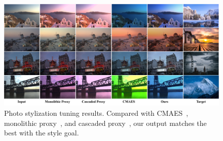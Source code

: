 \documentclass{article}
\newcommand{\TaskPST}{Photo stylization tuning\xspace}
\begin{document}
\begin{table}[t]
\caption{Experimental results demonstrating efficiency across varying input resolutions. Our method significantly outperforms other methods, achieving a speed enhancement of 260 times relative to the cascaded proxy method~\cite{tseng2022neural} at 720P resolution, and 117 times faster than the CMAES approach~\cite{hansen2006cma, mosleh2020hardware} at 4K resolution.} 
\label{tab:runtime}
\centering
{}
\vspace{-0.3cm}
\end{table}

\begin{figure}[t]
\centering
  \includegraphics[width=\textwidth]{figures/fig_vis_style-v2.pdf}
  \caption{\TaskPST results. Compared with CMAES~\cite{hansen2006cma, mosleh2020hardware}, monolithic proxy~\cite{tseng2019hyperparameter}, and cascaded proxy~\cite{tseng2022neural}, our output matches the best with the style goal. \vspace{-15pt}}
  \label{fig:pst_vis}
\end{figure}
\end{document}

